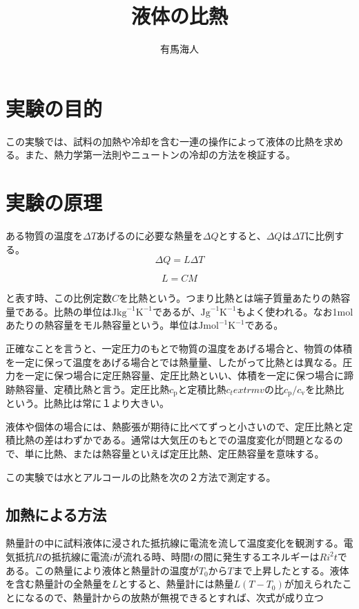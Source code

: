 \documentclass{jsarticle}
\begin{document}
\title{液体の比熱}
\author{有馬海人}
\maketitle

\section{実験の目的}


この実験では、試料の加熱や冷却を含む一連の操作によって液体の比熱を求める。また、熱力学第一法則やニュートンの冷却の方法を検証する。

\section{実験の原理}
ある物質の温度を$\Delta T$あげるのに必要な熱量を$\Delta Q$とすると、$\Delta Q$は$\Delta T$に比例する。
\begin{equation}
	\Delta Q = L \Delta T
\end{equation}

\begin{equation}
	L = CM
\end{equation}

と表す時、この比例定数$C$を比熱という。つまり比熱とは端子質量あたりの熱容量である。比熱の単位は$\textrm{Jkg}^{-1}\textrm{K}^{-1}$であるが、$\textrm{Jg}^{-1}\textrm{K}^{-1}$もよく使われる。なお1molあたりの熱容量をモル熱容量という。単位は$\textrm{Jmol}^{-1}\textrm{K}^{-1}$である。\\ 

\par 正確なことを言うと、一定圧力のもとで物質の温度をあげる場合と、物質の体積を一定に保って温度をあげる場合とでは熱量量、したがって比熱とは異なる。圧力を一定に保つ場合に定圧熱容量、定圧比熱といい、体積を一定に保つ場合に蹄跡熱容量、定積比熱と言う。定圧比熱$c_\textrm{p}$と定積比熱$c_textrm{v}$の比$c_\textrm{p}/c_\textrm{v}$を比熱比という。比熱比は常に１より大きい。\\

\par  液体や個体の場合には、熱膨張が期待に比べてずっと小さいので、定圧比熱と定積比熱の差はわずかである。通常は大気圧のもとでの温度変化が問題となるので、単に比熱、または熱容量といえば定圧比熱、定圧熱容量を意味する。\\

\par この実験では水とアルコールの比熱を次の２方法で測定する。

\subsection{加熱による方法}
熱量計の中に試料液体に浸された抵抗線に電流を流して温度変化を観測する。電気抵抗$R$の抵抗線に電流$i$が流れる時、時間$t$の間に発生するエネルギーは$Ri^{2}t$である。この熱量により液体と熱量計の温度が$T_0$から$T$まで上昇したとする。液体を含む熱量計の全熱量を$L$とすると、熱量計には熱量$L(T - T_0)$が加えられたことになるので、熱量計からの放熱が無視できるとすれば、次式が成り立つ
\end{document}
